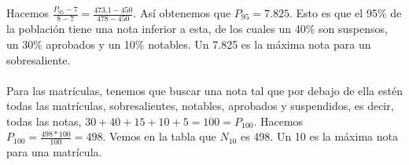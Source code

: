     Hacemos $\frac{P_{95}-7}{8-7}=\frac{473.1-450}{478-450}$. Así obtenemos que $P_{95} = 7.825$. Esto es que el 95\% de la población tiene una nota inferior a esta, de los cuales un 40\% son suspensos, un 30\% aprobados y un 10\% notables. Un 7.825 es la máxima nota para un sobresaliente. \\ \\
    Para las matrículas, tenemos que buscar una nota tal que por debajo de ella estén todas las matrículas, sobresalientes, notables, aprobados y suspendidos, es decir, todas las notas, $30+40+15+10+5 = 100 = P_{100}$. Hacemos $P_{100}=\frac{498*100}{100}=498$. Vemos en la tabla que $N_{10}$ es 498. Un 10 es la máxima nota para una matrícula.